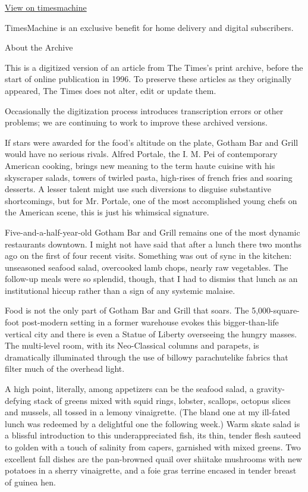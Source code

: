 \href{http://timesmachine.nytimes3xbfgragh.onion/timesmachine/1989/09/29/260589.html}{View
on timesmachine}

TimesMachine is an exclusive benefit for home delivery and digital
subscribers.

About the Archive

This is a digitized version of an article from The Times's print
archive, before the start of online publication in 1996. To preserve
these articles as they originally appeared, The Times does not alter,
edit or update them.

Occasionally the digitization process introduces transcription errors or
other problems; we are continuing to work to improve these archived
versions.

If stars were awarded for the food's altitude on the plate, Gotham Bar
and Grill would have no serious rivals. Alfred Portale, the I. M. Pei of
contemporary American cooking, brings new meaning to the term haute
cuisine with his skyscraper salads, towers of twirled pasta, high-rises
of french fries and soaring desserts. A lesser talent might use such
diversions to disguise substantive shortcomings, but for Mr. Portale,
one of the most accomplished young chefs on the American scene, this is
just his whimsical signature.

Five-and-a-half-year-old Gotham Bar and Grill remains one of the most
dynamic restaurants downtown. I might not have said that after a lunch
there two months ago on the first of four recent visits. Something was
out of sync in the kitchen: unseasoned seafood salad, overcooked lamb
chops, nearly raw vegetables. The follow-up meals were so splendid,
though, that I had to dismiss that lunch as an institutional hiccup
rather than a sign of any systemic malaise.

Food is not the only part of Gotham Bar and Grill that soars. The
5,000-square-foot post-modern setting in a former warehouse evokes this
bigger-than-life vertical city and there is even a Statue of Liberty
overseeing the hungry masses. The multi-level room, with its
Neo-Classical columns and parapets, is dramatically illuminated through
the use of billowy parachutelike fabrics that filter much of the
overhead light.

A high point, literally, among appetizers can be the seafood salad, a
gravity-defying stack of greens mixed with squid rings, lobster,
scallops, octopus slices and mussels, all tossed in a lemony
vinaigrette. (The bland one at my ill-fated lunch was redeemed by a
delightful one the following week.) Warm skate salad is a blissful
introduction to this underappreciated fish, its thin, tender flesh
sauteed to golden with a touch of salinity from capers, garnished with
mixed greens. Two excellent fall dishes are the pan-browned quail over
shiitake mushrooms with new potatoes in a sherry vinaigrette, and a foie
gras terrine encased in tender breast of guinea hen.

